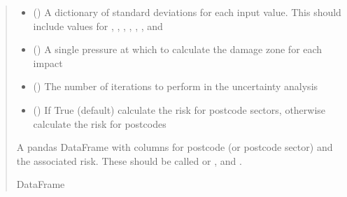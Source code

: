 \documentclass[letterpaper,10pt,english]{sphinxmanual}
\begin{document}
\begin{fulllineitems}
\begin{quote}
\begin{description}
\begin{itemize}
\item {} 
\sphinxAtStartPar
{} () \textendash{} A dictionary of standard deviations for each input value. This
should include values for , , ,
, , ,  and 

\item {} 
\sphinxAtStartPar
{} () \textendash{} A single pressure at which to calculate the damage zone for each impact

\item {} 
\sphinxAtStartPar
{} () \textendash{} The number of iterations to perform in the uncertainty analysis

\item {} 
\sphinxAtStartPar
{} (\sphinxstyleliteralemphasis{\sphinxupquote{, }}) \textendash{} If True (default) calculate the risk for postcode sectors, otherwise
calculate the risk for postcodes

\end{itemize}

\sphinxAtStartPar
{} \textendash{} A pandas DataFrame with columns for postcode (or postcode sector) and
the associated risk. These should be called  or ,
and .

\sphinxAtStartPar
DataFrame

\end{description}\end{quote}

\end{fulllineitems}

\label{\detokenize{index:module-mapping}}
\end{document}
